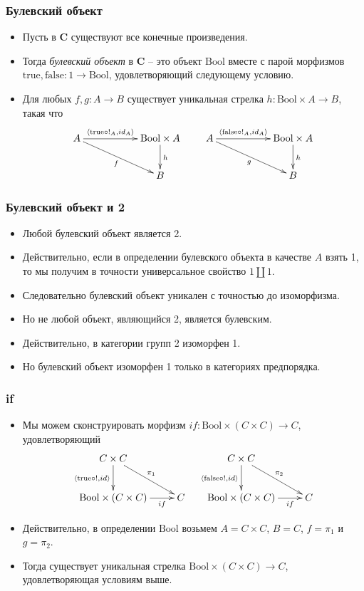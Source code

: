 \documentclass{beamer}
\theoremstyle{definition}
\newcommand{\cat}[1]{\mathbf{#1}}
\renewcommand{\C}{\cat{C}}
\newcommand{\bool}{\mathrm{Bool}}
\newcommand{\true}{\mathrm{true}}
\newcommand{\false}{\mathrm{false}}
\begin{document}
\begin{frame}
\frametitle{Булевский объект}
\begin{itemize}
\item Пусть в $\C$ существуют все конечные произведения.
\item Тогда \emph{булевский объект} в $\C$ -- это объект $\bool$ вместе с парой морфизмов $\true, \false : 1 \to \bool$, удовлетворяющий следующему условию.
\item Для любых $f, g : A \to B$ существует уникальная стрелка $h : \bool \times A \to B$, такая что
\[ \xymatrix{ A \ar[rr]^-{\langle \true \circ !_A, id_A \rangle} \ar[drr]_{f} & & \bool \times A \ar[d]^h \\
                                                                             & & B
            }
\qquad \xymatrix{ A \ar[rr]^-{\langle \false \circ !_A, id_A \rangle} \ar[drr]_{g} & & \bool \times A \ar[d]^h \\
                                                                              & & B
            }
\]
\end{itemize}
\end{frame}

\begin{frame}
\frametitle{Булевский объект и 2}
\begin{itemize}
\item Любой булевский объект является 2.
\item Действительно, если в определении булевского объекта в качестве $A$ взять 1, то мы получим в точности универсальное свойство $1 \amalg 1$.
\item Следовательно булевский объект уникален с точностью до изоморфизма.
\item Но не любой объект, являющийся 2, является булевским.
\item Действительно, в категории групп 2 изоморфен 1.
\item Но булевский объект изоморфен 1 только в категориях предпорядка.
\end{itemize}
\end{frame}

\begin{frame}
\frametitle{if}
\begin{itemize}
\item Мы можем сконструировать морфизм $if : \bool \times (C \times C) \to C$, удовлетворяющий
\[ \xymatrix{ C \times C \ar[d]_{\langle \true \circ !, id \rangle} \ar[rd]^{\pi_1} \\
              \bool \times (C \times C) \ar[r]_-{if} & C
            }
\quad \xymatrix{ C \times C \ar[d]_{\langle \false \circ !, id \rangle} \ar[rd]^{\pi_2} \\
              \bool \times (C \times C) \ar[r]_-{if} & C
            } \]
\item Действительно, в определении $\bool$ возьмем $A = C \times C$, $B = C$, $f = \pi_1$ и $g = \pi_2$.
\item Тогда существует уникальная стрелка $\bool \times (C \times C) \to C$, удовлетворяющая условиям выше.
\end{itemize}
\end{frame}
\end{document}
